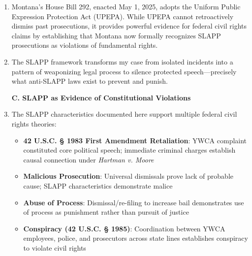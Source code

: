 \documentclass[12pt,letterpaper]{article}
\begin{document}
\begin{enumerate}
\begin{itemize}
\item I was forced to flee Washington \& Montana to escape ongoing harassment
\item I have been effectively silenced from making further complaints about institutional misconduct
\item My family developed severe agoraphobia and PTSD from fear of law enforcement
\item Future complainants are deterred from reporting YWCA misconduct
\item The YWCA has never investigated my complaint or implemented any reforms
\end{itemize}

\textbf{B. Montana's 2025 Anti-SLAPP Law and Retrospective Application}

\item Montana's House Bill 292, enacted May 1, 2025, adopts the Uniform Public Expression Protection Act (UPEPA). While UPEPA cannot retroactively dismiss past prosecutions, it provides powerful evidence for federal civil rights claims by establishing that Montana now formally recognizes SLAPP prosecutions as violations of fundamental rights.

\item The SLAPP framework transforms my case from isolated incidents into a pattern of weaponizing legal process to silence protected speech---precisely what anti-SLAPP laws exist to prevent and punish.

\textbf{C. SLAPP as Evidence of Constitutional Violations}

\item The SLAPP characteristics documented here support multiple federal civil rights theories:

\begin{itemize}
\item \textbf{42 U.S.C. § 1983 First Amendment Retaliation}: YWCA complaint constituted core political speech; immediate criminal charges establish causal connection under \textit{Hartman v. Moore}
\item \textbf{Malicious Prosecution}: Universal dismissals prove lack of probable cause; SLAPP characteristics demonstrate malice
\item \textbf{Abuse of Process}: Dismissal/re-filing to increase bail demonstrates use of process as punishment rather than pursuit of justice
\item \textbf{Conspiracy (42 U.S.C. § 1985)}: Coordination between YWCA employees, police, and prosecutors across state lines establishes conspiracy to violate civil rights
\end{itemize}

\end{enumerate}
\end{document}
